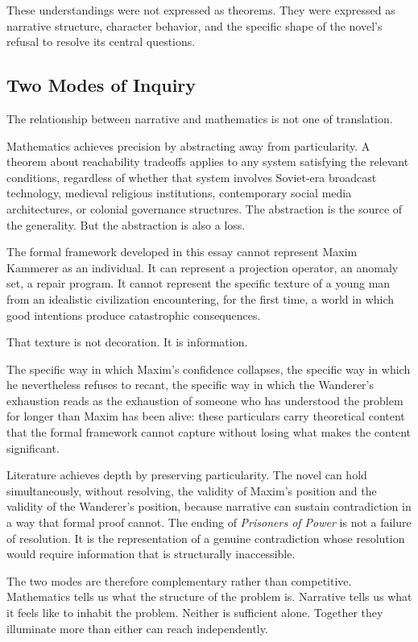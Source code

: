 \documentclass[12pt, a4paper]{article}
\theoremstyle{plain}
\theoremstyle{definition}
\theoremstyle{remark}
\begin{document}
These understandings were not expressed as
theorems. They were expressed as narrative
structure, character behavior, and the specific
shape of the novel's refusal to resolve its
central questions.

\subsection{Two Modes of Inquiry}

The relationship between narrative and mathematics
is not one of translation.

Mathematics achieves precision by abstracting
away from particularity. A theorem about
reachability tradeoffs applies to any system
satisfying the relevant conditions, regardless
of whether that system involves Soviet-era
broadcast technology, medieval religious
institutions, contemporary social media
architectures, or colonial governance structures.
The abstraction is the source of the generality.
But the abstraction is also a loss.

The formal framework developed in this essay
cannot represent Maxim Kammerer as an individual.
It can represent a projection operator, an anomaly
set, a repair program. It cannot represent the
specific texture of a young man from an idealistic
civilization encountering, for the first time,
a world in which good intentions produce
catastrophic consequences.

That texture is not decoration. It is information.

The specific way in which Maxim's confidence
collapses, the specific way in which he nevertheless
refuses to recant, the specific way in which the
Wanderer's exhaustion reads as the exhaustion of
someone who has understood the problem for longer
than Maxim has been alive: these particulars carry
theoretical content that the formal framework
cannot capture without losing what makes the
content significant.

Literature achieves depth by preserving
particularity. The novel can hold simultaneously,
without resolving, the validity of Maxim's position
and the validity of the Wanderer's position,
because narrative can sustain contradiction in
a way that formal proof cannot. The ending of
\textit{Prisoners of Power} is not a failure of
resolution. It is the representation of a genuine
contradiction whose resolution would require
information that is structurally inaccessible.

The two modes are therefore complementary rather
than competitive. Mathematics tells us what the
structure of the problem is. Narrative tells us
what it feels like to inhabit the problem. Neither
is sufficient alone. Together they illuminate more
than either can reach independently.
\end{document}
